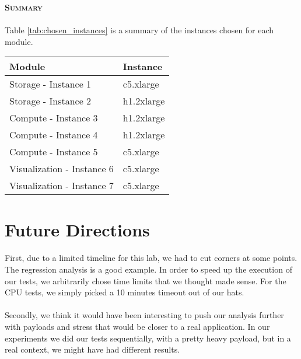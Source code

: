\documentclass[11pt]{article}
\begin{document}
		\pagebreak
		\textsc{\Large{\textbf{Summary}}} 

		\paragraph{} Table \ref{tab:chosen_instances} is a summary of the instances chosen for each
		module.
		
		\begin{center}
			 \label{tab:chosen_instances}
			\begin{tabular}{l|l}
				Module & Instance \\
				\hline
				Storage - Instance 1 & c5.xlarge \\
				Storage - Instance 2 & h1.2xlarge \\
				Compute - Instance 3 & h1.2xlarge \\
				Compute - Instance 4 & h1.2xlarge \\
				Compute - Instance 5 & c5.xlarge \\
				Visualization - Instance 6 & c5.xlarge \\
				Visualization - Instance 7 & c5.xlarge \\
			\end{tabular}
		\end{center}

\section{Future Directions}
		\paragraph{} First, due to a limited timeline for this lab, we had to
		cut corners at some points. The regression analysis is a good example.
		In order to speed up the execution of our tests, we arbitrarily chose
		time limits that we thought made sense. For the CPU tests, we simply
		picked a 10 minutes timeout out of our hats.

		\paragraph{} Secondly, we think it would have been interesting to push
		our analysis further with payloads and stress that would be closer to a
		real application. In our experiments we did our tests sequentially, with
		a pretty heavy payload, but in a real context, we might have had
		different results.
\end{document}
